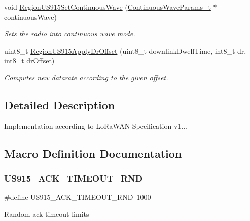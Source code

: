 \begin{DoxyCompactItemize}
void \hyperlink{group__REGIONUS915_gaa87cec170f4c2f1a257f8228b7dd321f}{Region\+U\+S915\+Set\+Continuous\+Wave} (\hyperlink{group__REGION_gaf39bb5ba06921139c6d17f88a8d518cd}{Continuous\+Wave\+Params\+\_\+t} $\ast$continuous\+Wave)
\begin{DoxyCompactList}\small\item\em Sets the radio into continuous wave mode. \end{DoxyCompactList}\item 
uint8\+\_\+t \hyperlink{group__REGIONUS915_ga3a13a700c4bbd1a703aaf73740f9f13c}{Region\+U\+S915\+Apply\+Dr\+Offset} (uint8\+\_\+t downlink\+Dwell\+Time, int8\+\_\+t dr, int8\+\_\+t dr\+Offset)
\begin{DoxyCompactList}\small\item\em Computes new datarate according to the given offset. \end{DoxyCompactList}\end{DoxyCompactItemize}


\subsection{Detailed Description}
Implementation according to Lo\+Ra\+W\+AN Specification v1... 

\subsection{Macro Definition Documentation}
\mbox{\label{group__REGIONUS915_ga96a643ec88acfe0188587fd0ed6251e5}} 
\subsubsection{\texorpdfstring{U\+S915\+\_\+\+A\+C\+K\+\_\+\+T\+I\+M\+E\+O\+U\+T\+\_\+\+R\+ND}{US915\_ACK\_TIMEOUT\_RND}}
{\footnotesize\ttfamily \#define U\+S915\+\_\+\+A\+C\+K\+\_\+\+T\+I\+M\+E\+O\+U\+T\+\_\+\+R\+ND~1000}

Random ack timeout limits \mbox{\label{group__REGIONUS915_ga4c39b2179e634fc588eb206e5b24fb8e}} 
